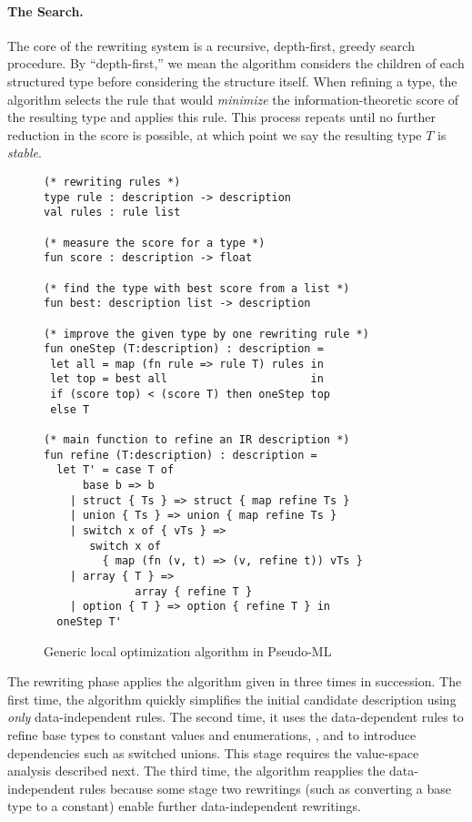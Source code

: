 \paragraph*{The Search.}
The core of the rewriting system is 
a recursive, depth-first, greedy search procedure. 
By ``depth-first,'' we mean the algorithm considers the 
children of each structured type before considering
the structure itself. When refining a type, the algorithm selects the rule that 
would {\em minimize} the information-theoretic score of the resulting
type and applies this rule.  This process repeats  until
no further reduction in the score is possible, at
which point we say the resulting type $T$ is {\em stable}.

\begin{figure}
{\small 
\begin{verbatim}
(* rewriting rules *)
type rule : description -> description  
val rules : rule list 

(* measure the score for a type *)
fun score : description -> float

(* find the type with best score from a list *)
fun best: description list -> description

(* improve the given type by one rewriting rule *)
fun oneStep (T:description) : description =
 let all = map (fn rule => rule T) rules in
 let top = best all                      in
 if (score top) < (score T) then oneStep top
 else T

(* main function to refine an IR description *) 
fun refine (T:description) : description =
  let T' = case T of
      base b => b
    | struct { Ts } => struct { map refine Ts }
    | union { Ts } => union { map refine Ts }
    | switch x of { vTs } => 
       switch x of 
         { map (fn (v, t) => (v, refine t)) vTs }
    | array { T } => 
              array { refine T }
    | option { T } => option { refine T } in
  oneStep T'
\end{verbatim}
}
\caption{Generic local optimization algorithm in Pseudo-ML}
\label{fig:refinement}
\end{figure}
The rewriting phase applies the
algorithm given in  three
times in succession. 
The first time, the algorithm quickly simplifies the initial candidate
description using {\em only} data-independent rules. The second time,
it uses the data-dependent 
rules to refine base types to constant values and enumerations, \etc{},
and to introduce dependencies such as switched unions. This stage
requires the value-space analysis described next.
The third time, the algorithm reapplies the data-independent rules
because some stage two rewritings (such as converting a base type to a
constant) enable further data-independent rewritings.

